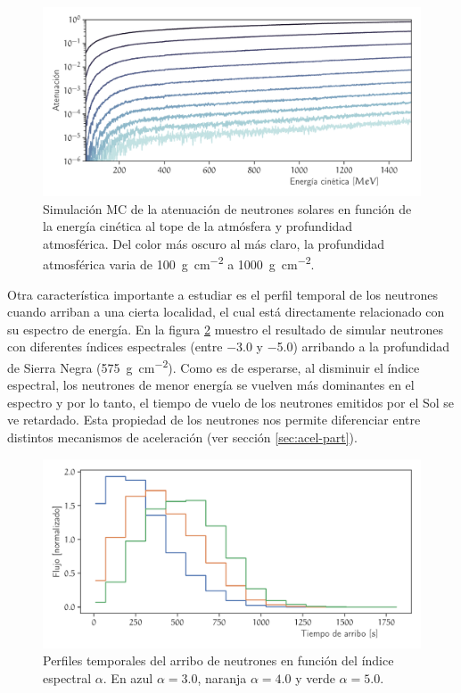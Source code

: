 \begin{figure}
        \centering
        \includegraphics[width=\textwidth]{neutron-at.pdf}
        \caption{Simulación MC de la atenuación de neutrones solares en función de la energía cinética al tope de la atmósfera y profundidad atmosférica. Del color más oscuro al más claro, la profundidad atmosférica varia de \SI{100}{\gram\per\square\cm} a \SI{1000}{\gram\per\square\cm}.}
        \label{fig:neutron-at}
\end{figure}

Otra característica importante a estudiar es el perfil temporal de los neutrones cuando arriban a una cierta localidad, el cual está directamente relacionado con su espectro de energía. En la figura \ref{fig:neutron-time} muestro el resultado de simular neutrones con diferentes índices espectrales (entre \num{-3.0} y \num{-5.0}) arribando a la profundidad de Sierra Negra (\SI{575}{\gram\per\square\cm}). Como es de esperarse, al disminuir el índice espectral, los neutrones de menor energía se vuelven más dominantes en el espectro y por lo tanto, el tiempo de vuelo de los neutrones emitidos por el Sol se ve retardado. Esta propiedad de los neutrones nos permite diferenciar entre distintos mecanismos de aceleración (ver sección \ref{sec:acel-part}).

\begin{figure}
        \centering
        \includegraphics[width=\textwidth]{neutron-time.pdf}
        \caption{Perfiles temporales del arribo de neutrones en función del índice espectral $\alpha$. En azul $\alpha=3.0$, naranja $\alpha=4.0$ y verde $\alpha=5.0$.}
        \label{fig:neutron-time}
\end{figure}

